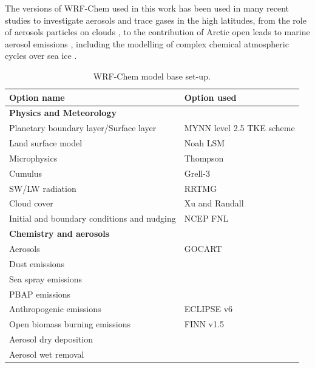     The versions of WRF-Chem used in this work has been used in many recent studies to investigate aerosols and trace gases in the high latitudes, from the role of aerosols particles on clouds \citep{marelle_aerosol_2025}, to the contribution of Arctic open leads to marine aerosol emissions \citep{lapere_modeling_2024}, including the modelling of complex chemical atmospheric cycles over sea ice \citep{ahmed_modelling_2023}.
    \vspace{\baselineskip}


\begin{table}[ht!]
    \centering
    \begin{tabular}{m{}m{}}
    \toprule
    \textbf{Option name}  &  \textbf{Option used} \\
    \midrule 
    \textbf{Physics and Meteorology}  &  \\
    Planetary boundary layer/Surface layer & MYNN level 2.5 TKE scheme \citep{nakanishi_development_2009} \\
    Land surface model & Noah LSM \citep{tewari_implementation_2004} \\
    Microphysics & Thompson \citep{thompson_study_2014} \\
    Cumulus & Grell-3 \citep{grell_generalized_2002} \\
    SW/LW radiation & RRTMG \citep{iacono_radiative_2008} \\
        Cloud cover & Xu and Randall \citep{xu_semiempirical_1996} \\ 
    Initial and boundary conditions and nudging & NCEP FNL \citep{commerce_ncep_2000}\\
    \midrule 
    \textbf{Chemistry and aerosols}  &  \\
        Aerosols &  GOCART \citep{chin_atmospheric_2000}\\
        Dust emissions & \citep{ginoux_long-term_2004} \\
        Sea spray emissions & \citep{ioannidis_modelling_2023} \\
        PBAP emissions & \citep{chatziparaschos_assessing_2025} \\
        Anthropogenic emissions & ECLIPSE v6 \citep{klimont_global_2024} \\
        Open biomass burning emissions & FINN v1.5 \citep{wiedinmyer_global_2014} \\
        Aerosol dry deposition & \citep{emerson_revisiting_2020} \\
        Aerosol wet removal & \citep{luo_further_2020} \\
    \bottomrule
    \end{tabular}
    \caption{WRF-Chem model base set-up.}
    \label{tab:wrf-chem_set-up}
\end{table}


